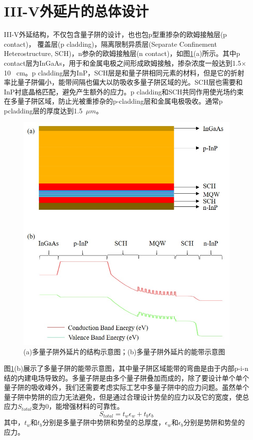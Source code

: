 \section{III-V外延片的总体设计}
III-V外延结构，不仅包含量子阱的设计，也也包p型重掺杂的欧姆接触层(p contact)， 覆盖层(p cladding)，隔离限制异质层(Separate Confinement Heterostructure, SCH)，n参杂的欧姆接触层(n contact)，如图\ref{fig_ch2_banddiagram}(a)所示。其中p contact层为InGaAs，用于和金属电极之间形成欧姆接触，掺杂浓度一般达到1.5$\times$10 ~cm。p cladding层为InP，SCH层是和量子阱相同元素的材料，但是它的折射率比量子阱偏小，能带间隔也偏大以防吸收多量子阱区域的光。SCH层也需要和InP衬底晶格匹配，避免产生额外的应力。p cladding和SCH共同作用使光场约束在多量子阱区域，防止光被重掺杂的p-cladding层和金属电极吸收。通常p pcladding层的厚度达到1.5~$\mu m$。
\begin{figure}[htb]
	\centering
	\includegraphics[width=12cm]{./Pictures/fig_ch2_banddiagram.jpg}
	\caption{(a)多量子阱外延片的结构示意图；(b)多量子阱外延片的能带示意图}
	\label{fig_ch2_banddiagram}
\end{figure}

图\ref{fig_ch2_banddiagram}(b)展示了多量子阱的能带示意图，其中量子阱区域能带的弯曲是由于内部p-i-n结的内建电场导致的。多量子阱是由多个量子阱叠加而成的，除了要设计单个单个量子阱的吸收峰外，我们还需要考虑实际工艺中多量子阱中的应力问题。虽然单个量子阱中势阱的应力无法避免，但是通过合理设计势垒的应力以及它的宽度，使总应力$S_{total}$变为0，能增强材料的可靠性\cite{chen2011high}。
\begin{equation}
\label{Equ:strain_net}
S_{total} = t_{w}\epsilon_{w}+t_b\epsilon_b
\end{equation}
其中，$t_{w}$和$t_{b}$分别是多量子阱中势阱和势垒的总厚度，$\epsilon_w$和$\epsilon_b$分别是势阱和势垒的应力。

